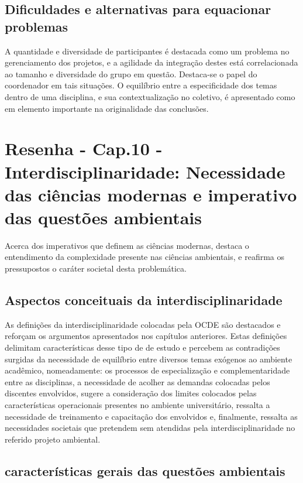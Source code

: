 \documentclass[
   article,       %
   12pt,          %
   oneside,       %
   a4paper,       %
   english,       %
   brazil,           %
   sumario=tradicional
   ]{abntex2}
\begin{document}
\subsection{Dificuldades e alternativas para equacionar problemas}

A quantidade e diversidade de participantes é destacada como um problema no gerenciamento dos projetos, e a agilidade da integração destes está correlacionada ao tamanho e diversidade do grupo em questão. Destaca-se o papel do coordenador em tais situações. O equilíbrio entre a especificidade dos temas dentro de uma disciplina, e sua contextualização no coletivo, é apresentado como em elemento importante na originalidade das conclusões.



\newpage{}

\section{Resenha - Cap.10 - Interdisciplinaridade: Necessidade das ciências modernas e imperativo das questões ambientais}

Acerca dos imperativos que definem as ciências modernas, \cite{modernas_Interdisciplinar} destaca o entendimento da complexidade presente nas ciências ambientais, e reafirma os pressupostos o caráter societal desta problemática. 


\subsection{Aspectos conceituais da interdisciplinaridade}

As definições da interdisciplinaridade colocadas pela OCDE são destacados e reforçam os argumentos apresentados nos capítulos anteriores. Estas definições delimitam características desse tipo de de estudo e percebem as contradições surgidas da necessidade de equilíbrio entre diversos temas exógenos ao ambiente acadêmico, nomeadamente: os processos de especialização e complementaridade entre as disciplinas, a necessidade de acolher as demandas colocadas pelos discentes envolvidos, sugere a consideração dos limites colocados pelas características operacionais presentes no ambiente universitário, ressalta a necessidade de treinamento e capacitação dos envolvidos e, finalmente, ressalta as necessidades societais que pretendem sem atendidas pela interdisciplinaridade no referido projeto ambiental.


\subsection{características gerais das questões ambientais}
\end{document}
